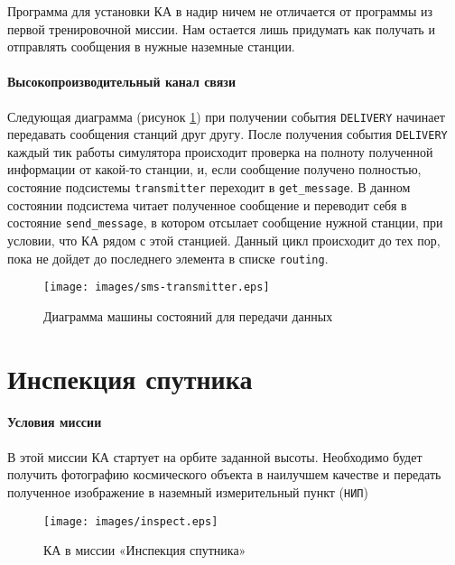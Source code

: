\documentclass[12pt,a4paper]{article}
\begin{document}
Программа для установки КА в надир ничем не отличается от программы из первой тренировочной миссии. Нам остается лишь придумать как получать и отправлять сообщения в нужные наземные станции.

\paragraph{Высокопроизводительный канал связи} Следующая диаграмма (рисунок \ref{Pic:SMS-transmitter}) при получении события \verb'DELIVERY' начинает передавать сообщения станций друг другу. После получения события \verb'DELIVERY' каждый тик работы симулятора происходит проверка на полноту полученной информации от какой-то станции, и, если сообщение получено полностью, состояние подсистемы \verb'transmitter' переходит в \verb'get_message'. В данном состоянии подсистема читает полученное сообщение и переводит себя в состояние \verb'send_message', в котором отсылает сообщение нужной станции, при условии, что КА рядом с этой станцией. Данный цикл происходит до тех пор, пока не дойдет до последнего элемента в списке \verb'routing'.

\begin{figure}[tbh]
  \begin{center}
    \texttt{[image: images/sms-transmitter.eps]}
    \caption{Диаграмма машины состояний для передачи данных}
    \label{Pic:SMS-transmitter}
  \end{center}
\end{figure}


\section{Инспекция спутника}

\paragraph{Условия миссии} В этой миссии КА стартует на орбите
заданной высоты. Необходимо будет получить фотографию космического объекта в наилучшем качестве и передать полученное изображение в наземный измерительный пункт (\verb'НИП')

\begin{figure}[tbh]
  \begin{center}
    \texttt{[image: images/inspect.eps]}
    \caption{КА в миссии «Инспекция спутника»}
    \label{Pic:Inspection}
  \end{center}
\end{figure}
\end{document}
